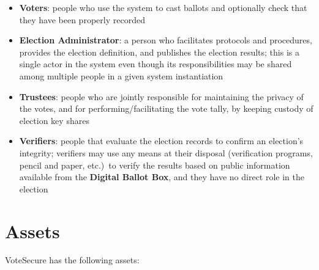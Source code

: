 \documentclass[10pt,letterpaper]{article}
\begin{document}
\begin{itemize}

    \item \textbf{Voters}: people who use the system to cast ballots and optionally check that they have been properly recorded

    \item \textbf{Election Administrator}: a person who facilitates protocols and procedures, provides the election definition, and publishes the election results; this is a single actor in the system even though its responsibilities may be shared among multiple people in a given system instantiation

    \item \textbf{Trustees}: people who are jointly responsible for maintaining the privacy of the votes, and for performing/facilitating the vote tally, by keeping custody of election key shares

    \item \textbf{Verifiers}: people that evaluate the election records to confirm an election's integrity; verifiers may use any means at their disposal (verification programs, pencil and paper, etc.)~to verify the results based on public information available from the \textbf{Digital Ballot Box}, and they have no direct role in the election

\end{itemize}

\section{Assets}

VoteSecure has the following assets:
\end{document}
